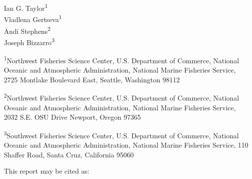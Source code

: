 
\begin{center}
\thispagestyle{empty}

\vspace{1.5cm}


\vspace{2cm}

Ian G. Taylor\textsuperscript{1}\\
Vladlena Gertseva\textsuperscript{1}\\
Andi Stephens\textsuperscript{2}\\
Joseph Bizzarro\textsuperscript{3}\\

\vspace{2cm}
\mbox{}

\vspace*{\fill}
\small

\textsuperscript{1}Northwest Fisheries Science Center, U.S. Department of Commerce, National Oceanic and Atmospheric Administration, National Marine Fisheries Service, 2725 Montlake Boulevard East, Seattle, Washington 98112\\

\vspace{.3cm}

\textsuperscript{2}Northwest Fisheries Science Center, U.S. Department of Commerce, National Oceanic and Atmospheric Administration, National Marine Fisheries Service, 2032 S.E. OSU Drive Newport, Oregon 97365

\vspace{.3cm}

\textsuperscript{3}Southwest Fisheries Science Center, U.S. Department of Commerce, National Oceanic and Atmospheric Administration, National Marine Fisheries Service, 110 Shaffer Road, Santa Cruz, California 95060\\



\vspace{.5cm}

\vfill


\vspace{.3cm}


\newpage{\thispagestyle{empty}}

\vspace*{\fill}
\begin{flushleft}
This report may be cited as:


\end{flushleft}
\end{center}
